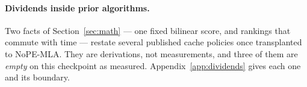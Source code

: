 \paragraph{Dividends inside prior algorithms.} Two facts of
Section~\ref{sec:math} --- one fixed bilinear score, and rankings that commute
with time --- restate several published cache policies once transplanted to
NoPE-MLA. They are derivations, not measurements, and three of them are
\emph{empty} on this checkpoint as measured. Appendix~\ref{app:dividends}
gives each one and its boundary.

